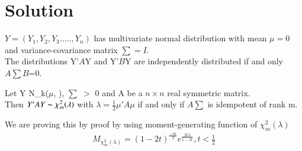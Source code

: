 \documentclass[journal,12pt,twocolumn]{IEEEtran}
\begin{document}
\section*{Solution}
\begin{lemma}
 $Y=(Y_1,Y_2,Y_3.....,Y_n)$ has multivariate normal distribution with mean $\mu=0$ and variance-covariance matrix $\sum=I$.\\
The distributions Y'$A$Y and  Y'$B$Y  are independently distributed if and only  $A\sum B$=0.\\
 \end{lemma}
\begin{lemma}
Let {Y \thicksim N_k($\mu$, \sum)},  $\sum$ $>$ 0 and A be a  $n\times n$ real symmetric matrix.\\
Then $Y'AY \thicksim \chi^2_m(\lambda)$  with  $\lambda=\frac{1}{2}\mu'A\mu$ if and only if $A\sum$ is idempotent of rank m.\\
\end{lemma}
We are proving this by proof by using moment-generating function of $\chi^2_m(\lambda)$
\begin{align}
    M_{\chi_m^2(\lambda)}=(1-2t)^{\frac{-m}{2}}e^{\frac{2t\lambda}{1-2t}}, t< \frac{1}{2}
\end{align}
\end{document}
